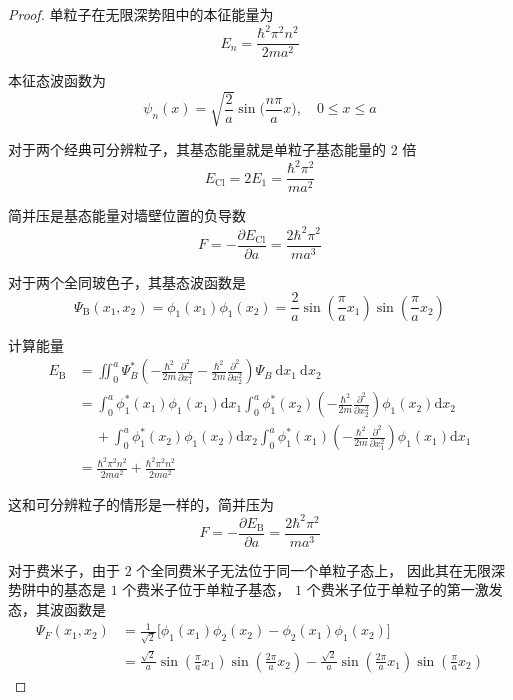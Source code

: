 \begin{proof}
单粒子在无限深势阻中的本征能量为
$$E_{n}=\frac{\hbar^{2} \pi^{2} n^{2}}{2 m a^{2}}$$

本征态波函数为
$$\psi_{n}(x)=\sqrt{\frac{2}{a}} \sin \Big(\frac{n \pi}{a} x\Big), \quad 0 \leq x \leq a$$

对于两个经典可分辨粒子，其基态能量就是单粒子基态能量的 $2$ 倍
$$E_{\mathrm{Cl}}=2 E_{1}=\frac{\hbar^{2} \pi^{2}}{m a^{2}}$$

简并压是基态能量对墙壁位置的负导数
$$F=-\frac{\partial E_{\mathrm{Cl}}}{\partial a}
=\frac{2 \hbar^{2} \pi^{2}}{m a^{3}}$$

对于两个全同玻色子，其基态波函数是
$$\Psi_{\mathrm{B}}(x_{1}, x_{2})=\phi_{1}(x_{1}) \phi_{1}(x_{2})
=\frac{2}{a} \sin \left(\frac{\pi}{a} x_{1}\right) \sin \left(\frac{\pi}{a} x_{2}\right)$$

计算能量
$$
\begin{aligned}
E_{\mathrm{B}}&= \iint_{0}^{a} \Psi_{B}^{*}\left(-\frac{\hbar^{2}}{2m} \frac{\partial^{2}}{\partial x_{1}^{2}}-\frac{\hbar^{2}}{2m} \frac{\partial^{2}}{\partial x_{2}^{2}}\right) \Psi_{B} \mathrm{~d} x_{1} \mathrm{~d} x_{2} \\
&= \int_{0}^{a} \phi_{1}^{*}(x_{1}) \phi_{1}(x_{1}) \mathrm{d} x_{1} \int_{0}^{a} \phi_{1}^{*}(x_{2})\left(-\frac{\hbar^{2}}{2 m} \frac{\partial^{2}}{\partial x_{2}^{2}}\right) \phi_{1}(x_{2}) \mathrm{d} x_{2} \\
& \quad\ +\int_{0}^{a} \phi_{1}^{*}(x_{2}) \phi_{1}(x_{2}) \mathrm{d} x_{2} \int_{0}^{a} \phi_{1}^{*}(x_{1})\left(-\frac{\hbar^{2}}{2 m} \frac{\partial^{2}}{\partial x_{1}^{2}}\right) \phi_{1}(x_{1}) \mathrm{d} x_{1} \\
&= \frac{\hbar^{2} \pi^{2} n^{2}}{2ma^{2}}+\frac{\hbar^{2} \pi^{2} n^{2}}{2ma^{2}}
\end{aligned}
$$

这和可分辨粒子的情形是一样的，简并压为
$$F=-\frac{\partial E_{\mathrm{B}}}{\partial a}
=\frac{2 \hbar^{2} \pi^{2}}{m a^{3}}$$

对于费米子，由于 $2$ 个全同费米子无法位于同一个单粒子态上，
因此其在无限深势阱中的基态是 $1$ 个费米子位于单粒子基态，
$1$ 个费米子位于单粒子的第一激发态，其波函数是
$$\begin{aligned}
\Psi_{F}(x_{1}, x_{2}) & =\frac{1}{\sqrt{2}}\big[\phi_{1}(x_{1}) \phi_{2}(x_{2})-\phi_{2}(x_{1}) \phi_{1}(x_{2})\big] \\
& =\frac{\sqrt{2}}{a} \sin \left(\frac{\pi}{a} x_{1}\right) \sin \left(\frac{2 \pi}{a} x_{2}\right)
-\frac{\sqrt{2}}{a} \sin \left(\frac{2 \pi}{a} x_{1}\right) \sin \left(\frac{\pi}{a} x_{2}\right)
\end{aligned}$$


\end{proof}

